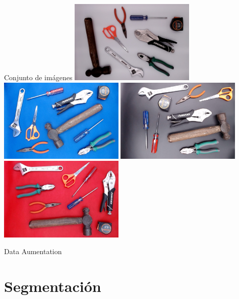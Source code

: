 \documentclass[
  24pt, %
]{beamer}
\begin{document}
\begin{frame}{Conjunto de imágenes}
  \centering
  \includegraphics[width=0.45\textwidth,height=0.35\textheight]{todas_blanco}
  \includegraphics[width=0.45\textwidth,height=0.35\textheight]{todo_azul}
  \includegraphics[width=0.45\textwidth,height=0.35\textheight]{todo_negro}
  \includegraphics[width=0.45\textwidth,height=0.35\textheight]{todo_rojo}
\end{frame}

\begin{frame}{Data Aumentation}
\centering
{}
\end{frame}

\section{Segmentación}
\end{document}
